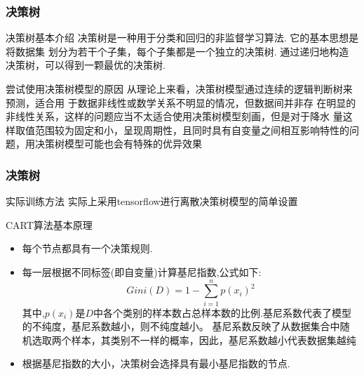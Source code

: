 \documentclass[10pt]{beamer}
\begin{document}
\begin{frame}
	\frametitle{决策树}
	\begin{block}{决策树基本介绍}
		决策树是一种用于分类和回归的非监督学习算法. 它的基本思想是将数据集
		划分为若干个子集，每个子集都是一个独立的决策树. 通过递归地构造
		决策树，可以得到一颗最优的决策树.
	\end{block}

	\begin{block}{尝试使用决策树模型的原因}
		从理论上来看，决策树模型通过连续的逻辑判断树来预测，适合用
		于数据非线性或数学关系不明显的情况，但数据间并非存
		在明显的非线性关系，这样的问题应当不太适合使用决策树模型刻画，但是对于降水
		量这样取值范围较为固定和小，呈现周期性，且同时具有自变量之间相互影响特性的问题，用决策树模型可能也会有特殊的优异效果
	\end{block}
\end{frame}

\begin{frame}
	\frametitle{决策树}
	\begin{block}{实际训练方法}
		实际上采用tensorflow进行离散决策树模型的简单设置
	\end{block}

	\begin{block}{CART算法基本原理}
		\begin{itemize}
			\item 每个节点都具有一个决策规则.
			\item 每一层根据不同标签(即自变量)计算基尼指数,公式如下:
			      \begin{equation}
				      Gini(D) = 1-\sum_{i=1}^{n}{{p(x_i)}^2}
			      \end{equation}
			      其中,$p(x_i)$是$D$中各个类别的样本数占总样本数的比例.基尼系数代表了模型的不纯度，基尼系数越小，则不纯度越小。
			      基尼系数反映了从数据集合中随机选取两个样本，其类别不一样的概率，因此，基尼系数越小代表数据集越纯
			\item 根据基尼指数的大小，决策树会选择具有最小基尼指数的节点.
		\end{itemize}
	\end{block}
\end{frame}
\end{document}
